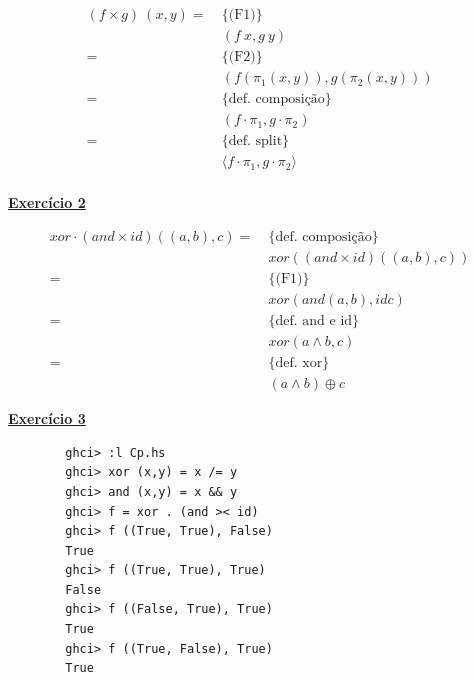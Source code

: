 \documentclass[a4paper,11pt]{article}
\begin{document}
\begin{center}
\begin{minipage}{0.5\textwidth}
	\begin{mdframed}
		\[
		\begin{aligned}
			(f \times g) \  (x, y)
			= \  &\{\text{(F1)}\}\\
			&(f \  x, g \  y) \\
			= \  &\{\text{(F2)}\}\\
			&(f (\pi_1 (x, y)), g (\pi_2 (x, y))) \\
			= \  &\{\text{def. composição}\}\\
			&(f \cdot \pi_1, g \cdot \pi_2) \\
			= \  &\{\text{def. split}\}\\
			&\langle f \cdot \pi_1, g \cdot \pi_2 \rangle \\
		\end{aligned}
		\]
	\end{mdframed}
\end{minipage}
\end{center}

\newpage

	\noindent \underline{\textbf{Exercício 2}}
	
\begin{center}
	\begin{minipage}{0.6\textwidth}
		\begin{mdframed}
			\[
			\begin{aligned}
				xor \cdot (and \times id) ((a, b), c)
				= \  &\{\text{def. composição}\}\\
				&xor ((and \times id) ((a, b), c))\\
				= \  &\{\text{(F1)}\}\\
				&xor(and (a, b), id c)\\
				= \  &\{\text{def. and e id}\}\\
				&xor(a \land b, c)\\
				= \  &\{\text{def. xor}\}\\
				&(a \land b) \oplus c
			\end{aligned}
			\]
		\end{mdframed}
	\end{minipage}
\end{center}
	
	
	\noindent \underline{\textbf{Exercício 3}}
	
	\begin{verbatim}
		ghci> :l Cp.hs
		ghci> xor (x,y) = x /= y
		ghci> and (x,y) = x && y
		ghci> f = xor . (and >< id)
		ghci> f ((True, True), False)
		True
		ghci> f ((True, True), True)
		False
		ghci> f ((False, True), True)
		True
		ghci> f ((True, False), True)
		True
	\end{verbatim}
	
\end{document}
